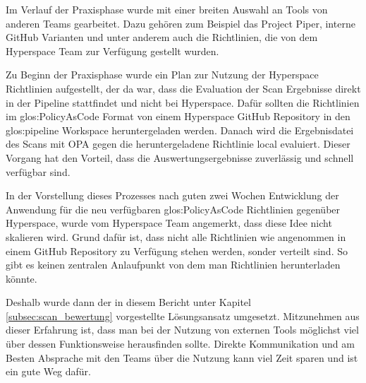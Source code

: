 \documentclass[../main.tex]{subfiles}
\begin{document}
Im Verlauf der Praxisphase wurde mit einer breiten Auswahl an Tools von anderen Teams gearbeitet.
Dazu gehören zum Beispiel das Project Piper, interne GitHub Varianten und unter anderem auch die Richtlinien, die von dem Hyperspace Team zur Verfügung gestellt wurden.

Zu Beginn der Praxisphase wurde ein Plan zur Nutzung der Hyperspace Richtlinien aufgestellt, der da war, dass die Evaluation der Scan Ergebnisse direkt in der Pipeline stattfindet und nicht bei Hyperspace.
Dafür sollten die Richtlinien im \gls{glos:PolicyAsCode} Format von einem Hyperspace GitHub Repository in den \gls{glos:pipeline} Workspace heruntergeladen werden.
Danach wird die Ergebnisdatei des Scans mit \gls{OPA} gegen die heruntergeladene Richtlinie local evaluiert.
Dieser Vorgang hat den Vorteil, dass die Auswertungsergebnisse zuverlässig und schnell verfügbar sind.

In der Vorstellung dieses Prozesses nach guten zwei Wochen Entwicklung der Anwendung für die neu verfügbaren \gls{glos:PolicyAsCode} Richtlinien gegenüber Hyperspace, wurde vom Hyperspace Team angemerkt, dass diese Idee nicht skalieren wird.
Grund dafür ist, dass nicht alle Richtlinien wie angenommen in einem GitHub Repository zu Verfügung stehen werden, sonder verteilt sind.
So gibt es keinen zentralen Anlaufpunkt von dem man Richtlinien herunterladen könnte.

Deshalb wurde dann der in diesem Bericht unter Kapitel \ref{subsec:scan_bewertung} vorgestellte Lösungsansatz umgesetzt.
Mitzunehmen aus dieser Erfahrung ist, dass man bei der Nutzung von externen Tools möglichst viel über dessen Funktionsweise herausfinden sollte.
Direkte Kommunikation und am Besten Absprache mit den Teams über die Nutzung kann viel Zeit sparen und ist ein gute Weg dafür.
\end{document}
